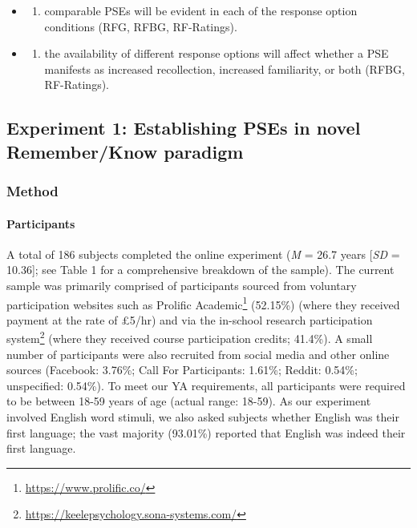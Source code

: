 \documentclass[
  11pt,
]{article}
\providecommand{\tightlist}{%
  \setlength{\itemsep}{0pt}\setlength{\parskip}{0pt}}
\begin{document}
\begin{enumerate}
  \begin{itemize}
  \item
    \begin{enumerate}
    \def\labelenumii{\roman{enumii})}
    \tightlist
    \item
      comparable PSEs will be evident in each of the response option
      conditions (RFG, RFBG, RF-Ratings).
    \end{enumerate}
  \item
    \begin{enumerate}
    \def\labelenumii{\roman{enumii})}
    \setcounter{enumii}{1}
    \tightlist
    \item
      the availability of different response options will affect whether
      a PSE manifests as increased recollection, increased familiarity,
      or both (RFBG, RF-Ratings).
    \end{enumerate}
  \end{itemize}
\end{enumerate}

\hypertarget{experiment-1-establishing-pses-in-novel-rememberknow-paradigm}{%
\subsection{Experiment 1: Establishing PSEs in novel Remember/Know
paradigm}\label{experiment-1-establishing-pses-in-novel-rememberknow-paradigm}}

\hypertarget{method}{%
\subsubsection{Method}\label{method}}

\hypertarget{participants}{%
\paragraph{Participants}\label{participants}}

\hfill\break A total of 186 subjects completed the online experiment
(\emph{M} = 26.7 years {[}\emph{SD} = 10.36{]}; see Table 1 for a
comprehensive breakdown of the sample). The current sample was primarily
comprised of participants sourced from voluntary participation websites
such as Prolific Academic\footnote{\url{https://www.prolific.co/}}
(52.15\%) (where they received payment at the rate of £5/hr) and via the
in-school
research participation system\footnote{\url{https://keelepsychology.sona-systems.com/}}
(where they received course participation credits; 41.4\%). A small
number of participants were also recruited from social media and other
online sources (Facebook: 3.76\%; Call For Participants: 1.61\%; Reddit:
0.54\%; unspecified: 0.54\%). To meet our YA requirements, all
participants were required to be between 18-59 years of age (actual
range: 18-59). As our experiment involved English word stimuli, we also
asked subjects whether English was their first language; the vast
majority (93.01\%) reported that English was indeed their first
language.
\end{document}
